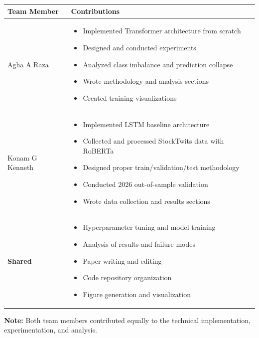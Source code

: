 \documentclass[10pt,twocolumn]{article}
\begin{document}
\begin{table}[h]
\centering
\begin{tabular}{p{3cm}p{10cm}}
\toprule
\textbf{Team Member} & \textbf{Contributions} \\
\midrule
Agha A Raza & 
\begin{itemize}
\item Implemented Transformer architecture from scratch
\item Designed and conducted experiments
\item Analyzed class imbalance and prediction collapse
\item Wrote methodology and analysis sections
\item Created training visualizations
\end{itemize} \\
\midrule
Konam G Kenneth & 
\begin{itemize}
\item Implemented LSTM baseline architecture
\item Collected and processed StockTwits data with RoBERTa
\item Designed proper train/validation/test methodology
\item Conducted 2026 out-of-sample validation
\item Wrote data collection and results sections
\end{itemize} \\
\midrule
\textbf{Shared} & 
\begin{itemize}
\item Hyperparameter tuning and model training
\item Analysis of results and failure modes
\item Paper writing and editing
\item Code repository organization
\item Figure generation and visualization
\end{itemize} \\
\bottomrule
\end{tabular}
\end{table}

\textbf{Note:} Both team members contributed equally to the technical implementation, experimentation, and analysis.
\end{document}

